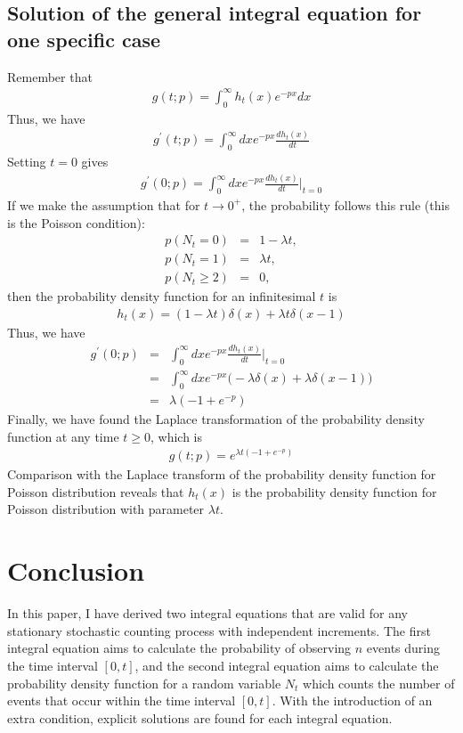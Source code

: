 \documentclass[10pt]{article}
\numberwithin{figure}{section}
\numberwithin{equation}{section}
\begin{document}
\subsection{Solution of the general integral equation for one specific case}
Remember that 
\begin{eqnarray}
g(t; p) = \int_{0}^{\infty} h_{t}(x) e^{-px} dx
\end{eqnarray}
Thus, we have 
\begin{eqnarray}
g^{\prime}(t; p) = \int_{0}^{\infty} dx e^{-px} \frac{dh_{t}(x)}{dt}
\end{eqnarray}
Setting $t = 0$ gives 
\begin{eqnarray}
g^{\prime}(0; p) = \int_{0}^{\infty} dx e^{-px} \frac{dh_{t}(x)}{dt}\Bigg\vert_{t = 0}
\end{eqnarray}
If we make the assumption that for $t \rightarrow 0^{+}$, the probability follows this rule (this is the Poisson condition): 
\begin{eqnarray}
p(N_{t} = 0) &=& 1 - \lambda t, \\\nonumber
p(N_{t} = 1) &=& \lambda t, \\\nonumber
p(N_t \ge 2) &=& 0, 
\end{eqnarray}
then the probability density function for an infinitesimal $t$ is 
\begin{eqnarray}
h_{t}(x) = (1 - \lambda t)\delta(x) + \lambda t \delta(x - 1)
\end{eqnarray}
Thus, we have 
\begin{eqnarray}
g^{\prime}(0; p) &=& \int_{0}^{\infty} dx e^{-px} \frac{dh_{t}(x)}{dt}\Bigg\vert_{t = 0} \\\nonumber
&=& \int_{0}^{\infty} dx e^{-px} \Big( -\lambda \delta(x) + \lambda\delta(x - 1)\Big) \\\nonumber
&=& \lambda(-1 + e^{-p})
\end{eqnarray}
Finally, we have found the Laplace transformation of the probability density function at any time $t \ge 0$, which is 
\begin{eqnarray}
g(t; p) = e^{\lambda t(-1 + e^{-p})}
\end{eqnarray}
Comparison with the Laplace transform of the probability density function for Poisson distribution reveals that $h_{t}(x)$ is the probability density function for Poisson distribution with parameter $\lambda t$. 

\section{Conclusion}
\label{conclusion}
In this paper, I have derived two integral equations that are valid for any stationary stochastic counting process with independent increments. The first integral equation aims to calculate the probability of observing $n$ events during the time interval $[0, t]$, and the second integral equation aims to calculate the probability density function for a random variable $N_{t}$ which counts the number of events that occur within the time interval $[0, t]$. With the introduction of an extra condition, explicit solutions are found for each integral equation.  



\end{document}
